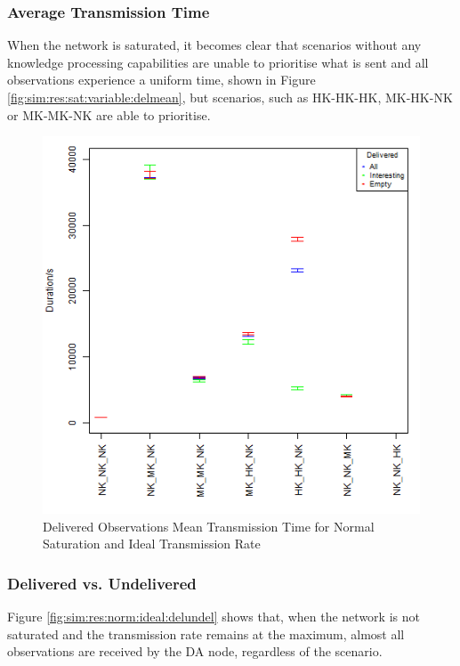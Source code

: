 \subsubsection{Average Transmission Time}
	When the network is saturated, it becomes clear that scenarios without any knowledge processing capabilities are unable to prioritise what is sent and all observations experience a uniform time, shown in Figure \ref{fig:sim:res:sat:variable:delmean}, but scenarios, such as HK-HK-HK, MK-HK-NK or MK-MK-NK are able to prioritise.
	\begin{figure}[H]
	\centering
	\includegraphics[width=\textwidth]{Chap7/figures/plots/normal_ideal/delivered_mean.png}
	\caption{Delivered Observations Mean Transmission Time for Normal Saturation and Ideal Transmission Rate}
	\label{fig:sim:res:norm:ideal:delmean}
	\end{figure}






\subsubsection{Delivered vs. Undelivered}
	Figure \ref{fig:sim:res:norm:ideal:delundel} shows that, when the network is not saturated and the transmission rate remains at the maximum, almost all observations are received by the DA node, regardless of the scenario. 







